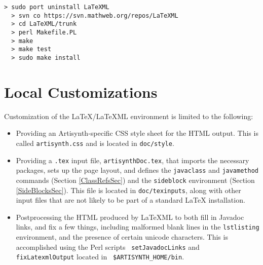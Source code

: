 \documentclass{article}
\begin{document}
\begin{lstlisting}[]
  > sudo port uninstall LaTeXML
  > svn co https://svn.mathweb.org/repos/LaTeXML
  > cd LaTeXML/trunk
  > perl Makefile.PL
  > make
  > make test
  > sudo make install
\end{lstlisting}

\section{Local Customizations}
\label{LocalCustomizationSec}

Customization of the LaTeX/LaTeXML environment is limited to the
following:

\begin{itemize}

\item Providing an Artisynth-specific CSS style sheet for the HTML output.
This is called {\tt artisynth.css} and is located in {\tt doc/style}.

\item Providing a {\tt .tex} input file, {\tt artisynthDoc.tex}, that
imports the necessary packages, sets up the page layout, and defines
the {\tt \BKS javaclass} and {\tt \BKS javamethod} commands (Section
\ref{ClassRefsSec}) and the {\tt sideblock} environment (Section
\ref{SideBlocksSec}).  This file is located in {\tt doc/texinputs},
along with other input files that are not likely to be part of a
standard LaTeX installation.

\item Postprocessing the HTML produced by LaTeXML to both fill in
Javadoc links, and fix a few things, including malformed blank lines
in the {\tt lstlisting} environment, and the presence of certain
unicode characters.  This is accomplished using the Perl scripts {\tt
setJavadocLinks} and {\tt fixLatexmlOutput} located in {\tt
\$ARTISYNTH\_HOME/bin}.

\end{itemize}
\end{document}
